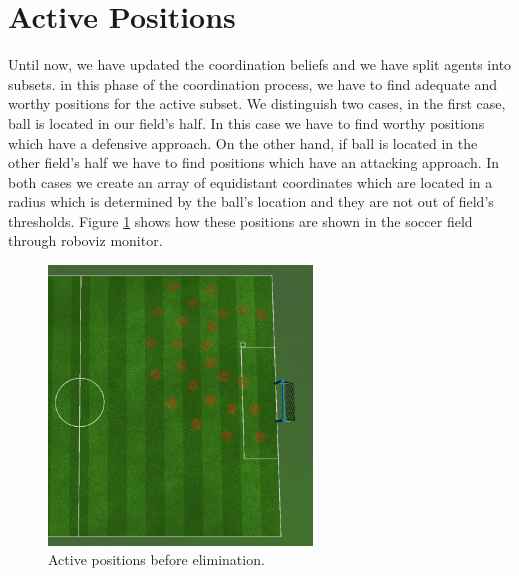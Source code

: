\section{Active Positions}
Until now, we have updated the coordination beliefs and we have split agents into subsets. in this phase of the coordination process, we have to find adequate and worthy positions for the active subset. We distinguish two cases, in the first case, ball is located in our field's half. In this case we have to find worthy positions which have a defensive approach. On the other hand, if ball is located in the other field's half we have to find positions which have an attacking approach. In both cases we create an array of equidistant coordinates which are located in a radius which is determined by the ball's location and they are not out of field's thresholds. Figure \ref{fig:ActivePositions2} shows how these positions are shown in the soccer field through roboviz monitor. 
\begin{figure}[htb!]
\centering
  \includegraphics[width=7cm]{Chapter4/figures/ActivePositions2.png}
  \caption{Active positions before elimination.} 
  \label{fig:ActivePositions2}
\end{figure}

